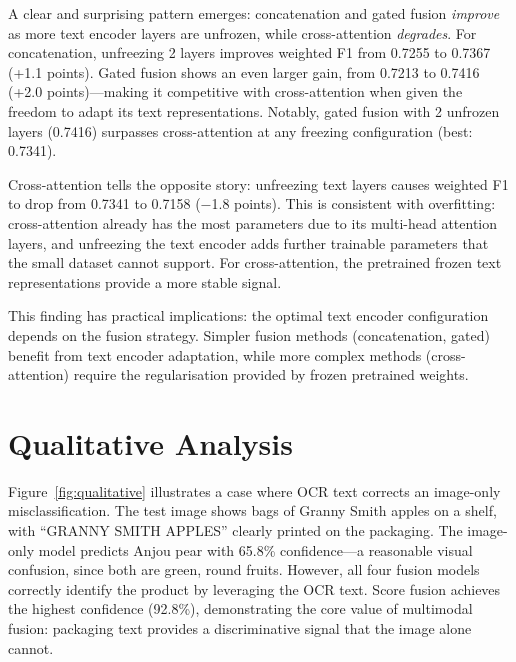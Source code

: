 \documentclass{article}
\begin{document}
A clear and surprising pattern emerges: concatenation and gated fusion \emph{improve} as more text encoder layers are unfrozen, while cross-attention \emph{degrades}. For concatenation, unfreezing 2 layers improves weighted F1 from 0.7255 to 0.7367 (+1.1 points). Gated fusion shows an even larger gain, from 0.7213 to 0.7416 (+2.0 points)---making it competitive with cross-attention when given the freedom to adapt its text representations. Notably, gated fusion with 2 unfrozen layers (0.7416) surpasses cross-attention at any freezing configuration (best: 0.7341).

Cross-attention tells the opposite story: unfreezing text layers causes weighted F1 to drop from 0.7341 to 0.7158 ($-$1.8 points). This is consistent with overfitting: cross-attention already has the most parameters due to its multi-head attention layers, and unfreezing the text encoder adds further trainable parameters that the small dataset cannot support. For cross-attention, the pretrained frozen text representations provide a more stable signal.

This finding has practical implications: the optimal text encoder configuration depends on the fusion strategy. Simpler fusion methods (concatenation, gated) benefit from text encoder adaptation, while more complex methods (cross-attention) require the regularisation provided by frozen pretrained weights.

\section{Qualitative Analysis}
\label{sec:qualitative}

Figure~\ref{fig:qualitative} illustrates a case where OCR text corrects an image-only misclassification. The test image shows bags of Granny Smith apples on a shelf, with ``GRANNY SMITH APPLES'' clearly printed on the packaging. The image-only model predicts Anjou pear with 65.8\% confidence---a reasonable visual confusion, since both are green, round fruits. However, all four fusion models correctly identify the product by leveraging the OCR text. Score fusion achieves the highest confidence (92.8\%), demonstrating the core value of multimodal fusion: packaging text provides a discriminative signal that the image alone cannot.
\end{document}
